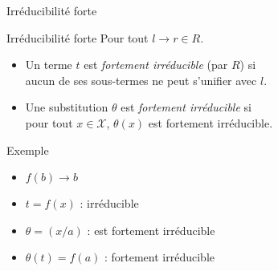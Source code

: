 \begin{frame}{Irréducibilité forte}
  \begin{block}{Irréducibilité forte}
    Pour tout $l \rightarrow r \in R$.\\
    \begin{itemize}[<+->]
    \item Un terme $t$ est {\em fortement irréducible} (par $R$) si\\
      aucun de ses sous-termes ne peut s'unifier avec $l$.\\
    \item Une substitution $\theta$ est {\em fortement irréducible} si\\
      pour tout $x \in \mathcal{X}$, $\theta(x)$ est fortement irréducible.
    \end{itemize}
  \end{block}
  \begin{exampleblock}{Exemple}
    \begin{itemize}
    \item {} $f(b) \rightarrow b$
    \item {} $t = f(x)$ :  irréducible
    \item {} $\theta = (x/a)$ :  est fortement irréducible
    \item {} $\theta(t) = f(a)$ :  fortement irréducible
    \end{itemize}
  \end{exampleblock}
\end{frame}

